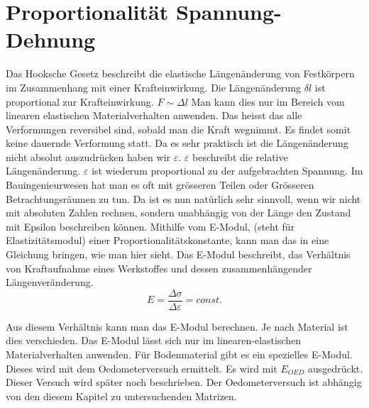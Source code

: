 \section{Proportionalität Spannung-Dehnung\label{spannung:section:Proportionalität Spannung-Dehnung}}
Das Hooksche Gesetz beschreibt die elastische Längenänderung von Festkörpern im Zusammenhang mit einer Krafteinwirkung.
Die Längenänderung $\delta l$ ist proportional zur Krafteinwirkung.
$F\sim \Delta l$
Man kann dies nur im Bereich vom linearen elastischen Materialverhalten anwenden.
Das heisst das alle Verformungen reversibel sind, sobald man die Kraft wegnimmt.
Es findet somit keine dauernde Verformung statt.
Da es sehr praktisch ist die Längenänderung nicht absolut auszudrücken haben wir $\varepsilon$.
$\varepsilon$ beschreibt die relative Längenänderung.
$\varepsilon$ ist wiederum proportional zu der aufgebrachten Spannung.
Im Bauingenieurwesen hat man es oft mit grösseren Teilen oder Grösseren Betrachtungsräumen zu tun.
Da ist es nun natürlich sehr sinnvoll, wenn wir nicht mit absoluten Zahlen rechnen,
sondern unabhängig von der Länge den Zustand mit Epsilon beschreiben können.
Mithilfe vom E-Modul, (steht für Elastizitätsmodul) einer Proportionalitätskonstante,
kann man das in eine Gleichung bringen, wie man hier sieht. Das E-Modul beschreibt,
das Verhältnis von Kraftaufnahme eines Werkstoffes und dessen zusammenhängender Längenveränderung.
\[
E
=
\frac{\Delta\sigma}{\Delta\varepsilon}
=
const.
\]

Aus diesem Verhältnis kann man das E-Modul berechnen.
Je nach Material ist dies verschieden.
Das E-Modul lässt sich nur im linearen-elastischen Materialverhalten anwenden.
Für Bodenmaterial gibt es ein spezielles E-Modul. Dieses wird mit dem Oedometerversuch ermittelt.
Es wird mit $E_{OED}$ ausgedrückt. Dieser Versuch wird später noch beschrieben.
Der Oedometerversuch ist abhängig von den diesem Kapitel zu untersuchenden Matrizen.



